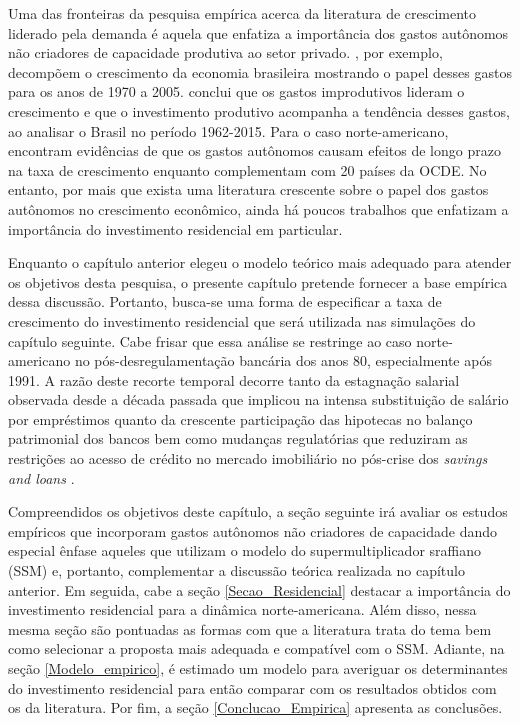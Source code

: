 Uma das fronteiras da pesquisa empírica acerca da literatura de crescimento liderado pela demanda é aquela que enfatiza a importância dos gastos autônomos não criadores de capacidade produtiva ao setor privado. \textcite{freitas_pattern_2013}, por exemplo, decompõem o crescimento da economia brasileira mostrando o papel desses gastos para os anos de  1970 a 2005. \textcite{braga_investment_2018} conclui que os gastos improdutivos lideram o crescimento e que o investimento produtivo acompanha a tendência desses gastos, ao analisar o Brasil no período 1962-2015. Para o caso norte-americano, \textcite{girardi_long-run_2016} encontram evidências de que os gastos autônomos causam efeitos de longo prazo na taxa de crescimento enquanto \textcite{girardi_autonomous_2018} complementam com 20 países da OCDE. No entanto, por mais que exista uma literatura crescente sobre o papel dos gastos autônomos no crescimento econômico, ainda há poucos trabalhos que enfatizam a importância do investimento residencial em particular. 

Enquanto o capítulo anterior elegeu o modelo teórico mais adequado para atender os objetivos desta pesquisa, o presente capítulo pretende fornecer a base empírica dessa discussão. Portanto, busca-se uma forma de especificar a taxa de crescimento do investimento residencial que será utilizada nas simulações do capítulo seguinte. 
Cabe frisar que essa análise se restringe ao caso norte-americano no pós-desregulamentação bancária dos anos 80, especialmente após 1991. A razão deste recorte temporal decorre tanto da estagnação salarial observada desde a década passada \cites{mian_house_2011}{teixeira_uma_2011} que implicou na intensa substituição de salário por empréstimos \cite{barba_rising_2009} quanto da crescente participação das hipotecas no balanço patrimonial dos bancos \cite{jorda_great_2014} bem como mudanças regulatórias que reduziram as restrições ao acesso de crédito no mercado imobiliário no pós-crise dos \textit{savings and loans} \cites{linneman_impacts_1989}{duca_empirical_1991}{federal_deposit_insurance_corporation_savings_1997}. 

Compreendidos os objetivos deste capítulo, a seção seguinte irá avaliar os estudos empíricos que incorporam gastos autônomos não criadores de capacidade dando especial ênfase aqueles que utilizam o modelo do supermultiplicador sraffiano (SSM) e, portanto, complementar a discussão teórica realizada no capítulo anterior. 
Em seguida, cabe a seção \ref{Secao_Residencial} destacar a importância do investimento residencial para a dinâmica norte-americana. Além disso, nessa mesma seção são pontuadas as formas com que a literatura trata do tema bem como selecionar a proposta mais adequada e compatível com o SSM. 
Adiante, na seção \ref{Modelo_empirico}, é estimado um modelo  para averiguar os determinantes do investimento residencial para então comparar com os resultados obtidos com os da literatura. Por fim, a seção \ref{Conclucao_Empirica} apresenta as conclusões.